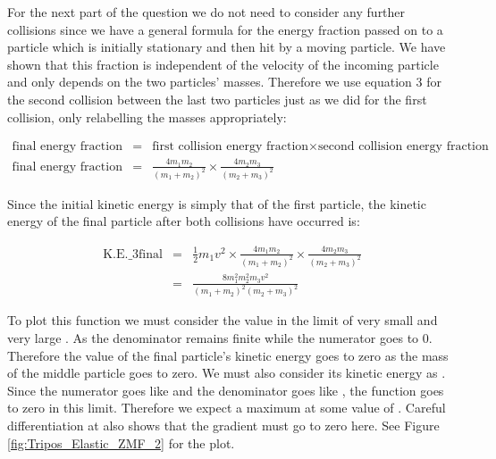 \begin{problem}
{For the next part of the question we do not need to consider any further collisions since we have a general formula for the energy fraction passed on to a particle which is initially stationary and then hit by a moving particle. We have shown that this fraction is independent of the velocity of the incoming particle and only depends on the two particles' masses. Therefore we use equation 3 for the second collision between the last two particles just as we did for the first collision, only relabelling the masses appropriately:

\begin{eqnarray*}
\text{final~energy~fraction} &=& \text{first~collision~energy~fraction} \times \text{second~collision~energy~fraction} \\
\text{final~energy~fraction} &=& \frac{4m_{1}m_{2}}{(m_{1}+m_{2})^{2}} \times \frac{4m_{2}m_{3}}{(m_{2}+m_{3})^{2}}
\end{eqnarray*}

Since the initial kinetic energy is simply that of the first particle, the kinetic energy of the final particle after both collisions have occurred is:

\begin{eqnarray*}
 \text{K.E._{3final}} &=& \frac{1}{2} m_1 v^2 \times \frac{4m_{1} m_{2}}{(m_{1}+m_{2})^{2}}\times \frac{4m_{2} m_{3}}{(m_{2}+m_{3})^{2}} \\
  &=& \frac{8 m_{1}^2 m_{2}^2 m_3 v^2}{(m_{1}+m_{2})^{2}(m_{2}+m_{3})^{2}}
\end{eqnarray*}


To plot this function we must consider the value in the limit of very small and very large . As  the denominator remains finite while the numerator goes to 0. Therefore the value of the final particle's kinetic energy goes to zero as the mass of the middle particle goes to zero. We must also consider its kinetic energy as . Since the numerator goes like  and the denominator goes like , the function goes to zero in this limit. Therefore we expect a maximum at some value of . Careful differentiation at  also shows that the gradient must go to zero here. See Figure \ref{fig:Tripos_Elastic_ZMF_2} for the plot. 

}
\end{problem}
